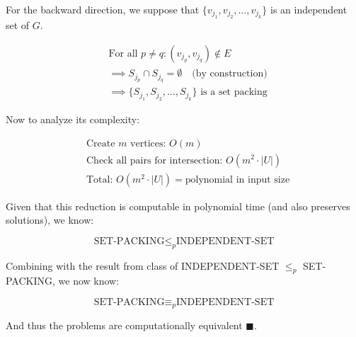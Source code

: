 \documentclass[12pt]{article}
\begin{document}
For the backward direction, we suppose that $\{ v_{j_{1}}, v_{j_{2}}, \dots, v_{j_{k}} \}$ is an independent set of $G$.

\begin{align}
&\text{For all } p \neq q: (v_{j_p}, v_{j_q}) \notin E\\
&\implies S_{j_p} \cap S_{j_q} = \emptyset \quad \text{(by construction)}\\
&\implies \{S_{j_1}, S_{j_2}, ..., S_{j_k}\} \text{ is a set packing}
\end{align}

Now to analyze its complexity:

\begin{align}
&\text{Create } m \text{ vertices: } O(m)\\
&\text{Check all pairs for intersection: } O(m^2 \cdot |U|)\\
&\text{Total: } O(m^2 \cdot |U|) = \text{polynomial in input size}
\end{align}

Given that this reduction is computable in polynomial time (and also preserves solutions), we know:

\[
\text{SET-PACKING} \leq_{p} \text{INDEPENDENT-SET}
\]

Combining with the result from class of INDEPENDENT-SET $\leq_{p}$ SET-PACKING, we now know:

\[
\text{SET-PACKING} \equiv_{p} \text{INDEPENDENT-SET}
\]

And thus the problems are computationally equivalent $\blacksquare$.
\end{document}
